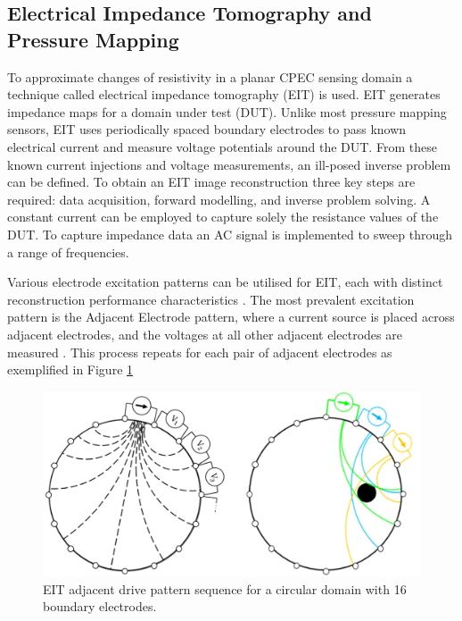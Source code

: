 \subsection{Electrical Impedance Tomography and Pressure Mapping}
To approximate changes of resistivity in a planar CPEC sensing domain a technique called electrical impedance tomography (EIT) is used. EIT generates impedance maps for a domain under test (DUT). Unlike most pressure mapping sensors, EIT uses periodically spaced boundary electrodes to pass known electrical current and measure voltage potentials around the DUT. From these known current injections and voltage measurements, an ill-posed inverse problem can be defined. To obtain an EIT image reconstruction three key steps are required: data acquisition, forward modelling, and inverse problem solving. A constant current can be employed to capture solely the resistance values of the DUT. To capture impedance data an AC signal is implemented to sweep through a range of frequencies. 

Various electrode excitation patterns can be utilised for EIT, each with distinct reconstruction performance characteristics \citep{Russo2017,Sherry2006,Brown1987}. The most prevalent excitation pattern is the Adjacent Electrode pattern, where a current source is placed across adjacent electrodes, and the voltages at all other adjacent electrodes are measured \citep{Adler2021}. This process repeats for each pair of adjacent electrodes as exemplified in Figure \ref{fig:EIT_adj_drive}
\begin{figure}[H]
	\centering
	\includegraphics[width=0.8\linewidth]{Figures/eit_sequence.png}
	\caption{EIT adjacent drive pattern sequence for a circular domain with 16 boundary electrodes.}
	\label{fig:EIT_adj_drive}
\end{figure}

